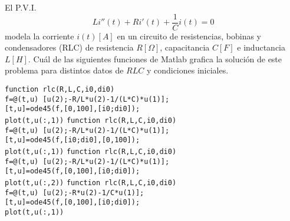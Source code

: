 \begin{pregunta}
\begin{cuerpo}
El P.V.I.
$$
Li''(t)+Ri'(t)+\frac{1}{C}i(t)=0
$$
modela la corriente $i(t)[A]$ en un circuito de resistencias, bobinas y condensadores (RLC) de resistencia $R[\Omega]$, capacitancia $C[F]$ e inductancia $L[H]$. Cu\'al de las siguientes funciones de Matlab grafica la soluci\'on de este problema para distintos datos de $RLC$ y condiciones iniciales.
\end{cuerpo}

\begin{multicols}{2}
\begin{alternativas}
{
\texttt{function rlc(R,L,C,i0,di0)}\\
\texttt{f=@(t,u) [u(2);-R/L*u(2)-1/(L*C)*u(1)];}\\
\texttt{[t,u]=ode45(f,[0,100],[i0;di0]);}\\
\texttt{plot(t,u(:,1))}		}
{
\texttt{function rlc(R,L,C,i0,di0)}\\
\texttt{f=@(t,u) [u(2);-R/L*u(2)-1/(L*C)*u(1)];}\\
\texttt{[t,u]=ode45(f,[i0;di0],[0,100]);}\\
\texttt{plot(t,u(:,1))}		}
{
\texttt{function rlc(R,L,C,i0,di0)}\\
\texttt{f=@(t,u) [u(2);-R/L*u(2)-1/(L*C)*u(1)];}\\
\texttt{[t,u]=ode45(f,[0,100],[i0;di0]);}\\
\texttt{plot(t,u(:,2))}		}
{
\texttt{function rlc(R,L,C,i0,di0)}\\
\texttt{f=@(t,u) [u(2);-R*u(2)-1/C*u(1)];}\\
\texttt{[t,u]=ode45(f,[0,100],[i0;di0]);}\\
\texttt{plot(t,u(:,1))}		}
\end{alternativas}
\end{multicols}
\justificacion{0cm}
\end{pregunta}